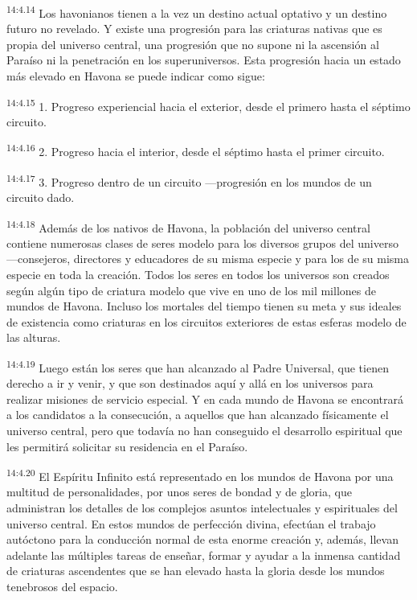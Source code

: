 \par
\textsuperscript{14:4.14} Los havonianos tienen a la vez un destino actual optativo y un destino futuro no revelado. Y existe una progresión para las criaturas nativas que es propia del universo central, una progresión que no supone ni la ascensión al Paraíso ni la penetración en los superuniversos. Esta progresión hacia un estado más elevado en Havona se puede indicar como sigue:

\par
\textsuperscript{14:4.15} 1. Progreso experiencial hacia el exterior, desde el primero hasta el séptimo circuito.

\par
\textsuperscript{14:4.16} 2. Progreso hacia el interior, desde el séptimo hasta el primer circuito.

\par
\textsuperscript{14:4.17} 3. Progreso dentro de un circuito ---progresión en los mundos de un circuito dado.

\par
\textsuperscript{14:4.18} Además de los nativos de Havona, la población del universo central contiene numerosas clases de seres modelo para los diversos grupos del universo ---consejeros, directores y educadores de su misma especie y para los de su misma especie en toda la creación. Todos los seres en todos los universos son creados según algún tipo de criatura modelo que vive en uno de los mil millones de mundos de Havona. Incluso los mortales del tiempo tienen su meta y sus ideales de existencia como criaturas en los circuitos exteriores de estas esferas modelo de las alturas.

\par
\textsuperscript{14:4.19} Luego están los seres que han alcanzado al Padre Universal, que tienen derecho a ir y venir, y que son destinados aquí y allá en los universos para realizar misiones de servicio especial. Y en cada mundo de Havona se encontrará a los candidatos a la consecución, a aquellos que han alcanzado físicamente el universo central, pero que todavía no han conseguido el desarrollo espiritual que les permitirá solicitar su residencia en el Paraíso.

\par
\textsuperscript{14:4.20} El Espíritu Infinito está representado en los mundos de Havona por una multitud de personalidades, por unos seres de bondad y de gloria, que administran los detalles de los complejos asuntos intelectuales y espirituales del universo central. En estos mundos de perfección divina, efectúan el trabajo autóctono para la conducción normal de esta enorme creación y, además, llevan adelante las múltiples tareas de enseñar, formar y ayudar a la inmensa cantidad de criaturas ascendentes que se han elevado hasta la gloria desde los mundos tenebrosos del espacio.

